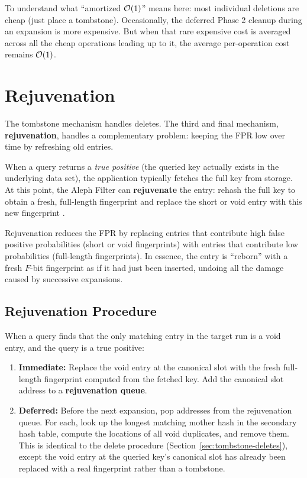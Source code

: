 To understand what ``amortized $\mathcal{O}(1)$'' means here: most 
individual deletions are cheap (just place a tombstone). Occasionally, 
the deferred Phase 2 cleanup during an expansion is more expensive. 
But when that rare expensive cost is averaged across all the cheap 
operations leading up to it, the average per-operation cost remains 
$\mathcal{O}(1)$.


\section{Rejuvenation}
\label{sec:rejuvenation}

The tombstone mechanism handles deletes. The third and final 
mechanism, \textbf{rejuvenation}, handles a complementary problem: 
keeping the FPR low over time by refreshing old entries.

When a query returns a \emph{true positive} (the queried key actually 
exists in the underlying data set), the application typically fetches 
the full key from storage. At this point, the Aleph Filter can 
\textbf{rejuvenate} the entry: rehash the full key to obtain a fresh, 
full-length fingerprint and replace the short or void entry with this 
new fingerprint \cite{aleph}.

Rejuvenation reduces the FPR by replacing entries that contribute 
high false positive probabilities (short or void fingerprints) with 
entries that contribute low probabilities (full-length fingerprints). 
In essence, the entry is ``reborn'' with a fresh $F$-bit fingerprint 
as if it had just been inserted, undoing all the damage caused by 
successive expansions.

\subsection{Rejuvenation Procedure}

When a query finds that the only matching entry in the target run is 
a void entry, and the query is a true positive:

\begin{enumerate}
  \item \textbf{Immediate:} Replace the void entry at the canonical 
        slot with the fresh full-length fingerprint computed from the 
        fetched key. Add the canonical slot address to a 
        \textbf{rejuvenation queue}.
  \item \textbf{Deferred:} Before the next expansion, pop addresses 
        from the rejuvenation queue. For each, look up the longest 
        matching mother hash in the secondary hash table, compute the 
        locations of all void duplicates, and remove them. This is 
        identical to the delete procedure 
        (Section~\ref{sec:tombstone-deletes}), except the void entry 
        at the queried key's canonical slot has already been replaced 
        with a real fingerprint rather than a tombstone.
\end{enumerate}


